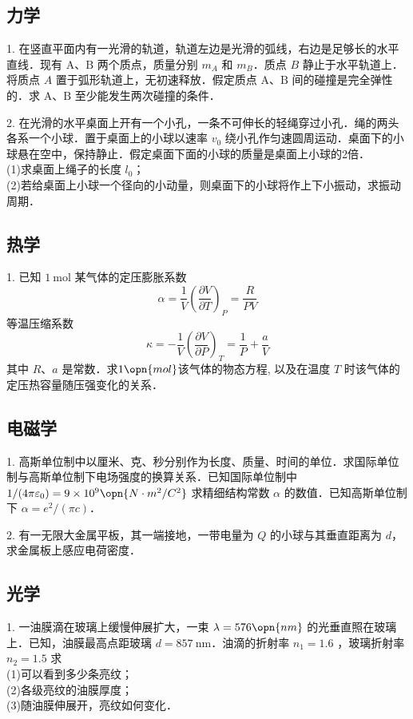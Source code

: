 \subsection{力学}
1. 在竖直平面内有一光滑的轨道，轨道左边是光滑的弧线，右边是足够长的水平直线．现有 $\mathrm{A}$、$\mathrm{B}$ 两个质点，质量分别 $m_{A}$ 和 $m_B$．质点 $B$ 静止于水平轨道上．将质点 $A$ 置于弧形轨道上，无初速释放．假定质点 $\mathrm{A}$、$\mathrm{B}$ 间的碰撞是完全弹性的．求 $\mathrm{A}$、$\mathrm{B}$ 至少能发生两次碰撞的条件．

2. 在光滑的水平桌面上开有一个小孔，一条不可伸长的轻绳穿过小孔．绳的两头各系一个小球．置于桌面上的小球以速率 $v_{0}$ 绕小孔作匀速圆周运动．桌面下的小球悬在空中，保持静止．假定桌面下面的小球的质量是桌面上小球的2倍．\\
(1)求桌面上绳子的长度 $l_{0}$；\\
(2)若给桌面上小球一个径向的小动量，则桌面下的小球将作上下小振动，求振动周期．
\subsection{热学}
1. 已知 $1 \mathrm{~mol}$ 某气体的定压膨胀系数
\begin{equation}
\alpha=\frac{1}{V}\left(\frac{\partial V}{\partial T}\right)_{P}=\frac{R}{P V}
\end{equation}
等温压缩系数 
\begin{equation}
\kappa=-\frac{1}{V}\left(\frac{\partial V}{\partial P}\right)_{T}=\frac{1}{P}+\frac{a}{V}
\end{equation}
其中 $R$、$a$ 是常数．求$1\opn{mol}$该气体的物态方程, 以及在温度 $T$ 时该气体的定压热容量随压强变化的关系．
\subsection{电磁学}
1. 高斯单位制中以厘米、克、秒分别作为长度、质量、时间的单位．求国际单位制与高斯单位制下电场强度的换算关系．已知国际单位制中 $1/(4 \pi \varepsilon_{0})=9 \times 10^{9} \opn{N \cdot m^{2}/C^{2}}$ 求精细结构常数 $\alpha$ 的数值．已知高斯单位制下 $\alpha=e^{2}/(\pi c)$．

2. 有一无限大金属平板，其一端接地，一带电量为 $Q$ 的小球与其垂直距离为 $d$，求金属板上感应电荷密度．
\subsection{光学}
1. 一油膜滴在玻璃上缓慢伸展扩大，一束 $\lambda=576 \opn{nm}$ 的光垂直照在玻璃上．已知，油膜最高点距玻璃 $d=857 \mathrm{~nm}$．油滴的折射率 $n_{1}=1.6$ ，玻璃折射率 $n_{2}=1.5$ 求\\
(1)可以看到多少条亮纹；\\
(2)各级亮纹的油膜厚度；\\
(3)随油膜伸展开，亮纹如何变化．
